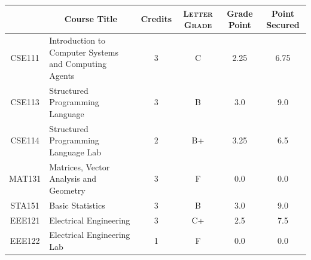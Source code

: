 \documentclass[11pt]{article}
\newcommand*{\numtwo}[1]{\pgfmathprintnumber[
                    fixed, precision=2, fixed zerofill=true]{#1}}
\begin{document}
                \begin{center}
                    \renewcommand{\arraystretch}{1.08}
                    
                \begin{tabular}{|c|l|c|>{\scshape}c|c|c|}
                \hline  \rule[-1ex]{0pt}{3.5ex} {\centering{\bf Course Code}} &  \multicolumn{1}{c|}{\textbf{Course Title}}  & {\bf Credits} & {\bf Letter Grade} & {\bf Grade Point} & {\bf Point Secured}  \\ 
                \hline   CSE111 &  Introduction to Computer Systems and Computing Agents		 & 3 & C & 2.25 & 6.75 \\ %
                \hline   CSE113 &  Structured Programming Language		 & 3 & B & 3.0 & 9.0 \\ %
                \hline   CSE114 &  Structured Programming Language Lab		 & 2 & B+ & 3.25 & 6.5 \\ %
                \hline   MAT131 &  Matrices, Vector Analysis and Geometry		 & 3 & F & 0.0 & 0.0 \\ %
                \hline   STA151 &  Basic Statistics		 & 3 & B & 3.0 & 9.0 \\ %
                \hline   EEE121 &  Electrical Engineering		 & 3 & C+ & 2.5 & 7.5 \\ %
                \hline   EEE122 &  Electrical Engineering Lab		 & 1 & F & 0.0 & 0.0 \\ %

\hline                %
                \end{tabular}
                \end{center}
                \renewcommand{\arraystretch}{1.03}
\end{document}
